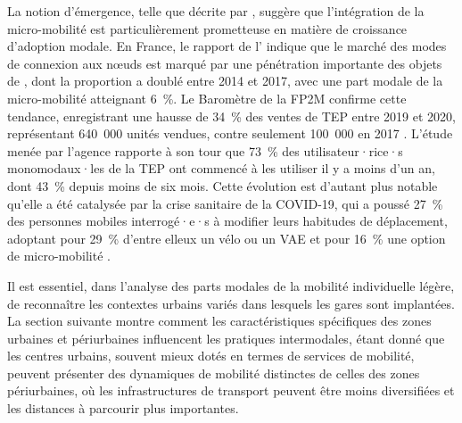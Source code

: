 \begin{refsegment}
La notion d'émergence, telle que décrite par \textcolor{blue}{\textcite[4]{kostrzewska_towards_2017}}, suggère que l'intégration de la micro-mobilité est particulièrement prometteuse en matière de croissance d'adoption modale. En France, le rapport de l'\textcolor{blue}{\textcite[10]{ademe_observatoire_2017}} indique que le marché des modes de connexion aux nœuds est marqué par une pénétration importante des objets de , dont la proportion a doublé entre 2014 et 2017, avec une part modale de la micro-mobilité atteignant 6~\%. Le Baromètre de la \acrfull{FP2M} confirme cette tendance, enregistrant une hausse de 34~\% des ventes de \acrshort{TEP} entre 2019 et 2020, représentant 640~000 unités vendues, contre seulement 100~000 en 2017 \textcolor{blue}{\autocite[2]{fp2m_barometre_2021}}. L'étude menée par l'agence \textcolor{blue}{\textcite[11]{smart_mobility_lab_usages_2020}} rapporte à son tour que 73~\% des utilisateur·rice·s monomodaux·les de la \acrshort{TEP} ont commencé à les utiliser il y a moins d'un an, dont 43~\% depuis moins de six mois. Cette évolution est d'autant plus notable qu'elle a été catalysée par la crise sanitaire de la COVID-19, qui a poussé 27~\% des personnes mobiles interrogé·e·s à modifier leurs habitudes de déplacement, adoptant pour 29~\% d'entre elleux un vélo ou un \acrshort{VAE} et pour 16~\% une option de micro-mobilité \textcolor{blue}{\autocite[16]{smart_mobility_lab_usages_2020}}.%

Il est essentiel, dans l'analyse des parts modales de la mobilité individuelle légère, de reconnaître les contextes urbains variés dans lesquels les gares sont implantées. La section suivante montre comment les caractéristiques spécifiques des zones urbaines et périurbaines influencent les pratiques intermodales, étant donné que les centres urbains, souvent mieux dotés en termes de services de mobilité, peuvent présenter des dynamiques de mobilité distinctes de celles des zones périurbaines, où les infrastructures de transport peuvent être moins diversifiées et les distances à parcourir plus importantes.%


\end{refsegment}
